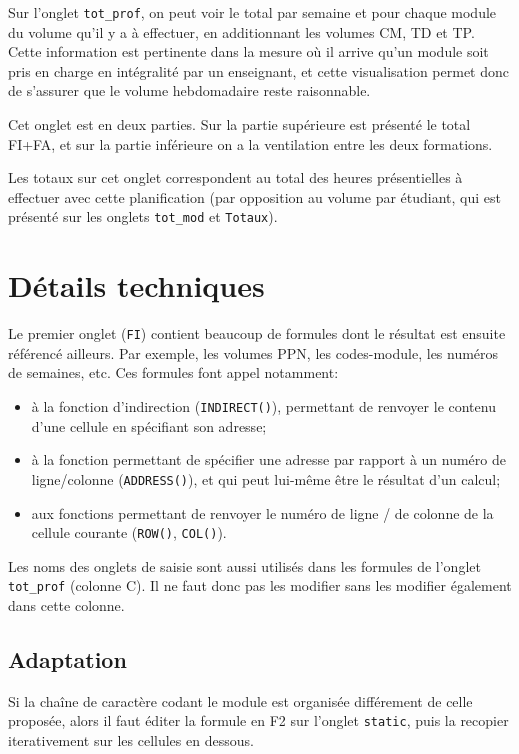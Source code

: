 \documentclass[12pt,a4paper]{article}
\begin{document}
Sur l'onglet {\tt tot\_prof}, on peut voir le total par semaine et pour chaque module du volume qu'il y a à effectuer, en additionnant les volumes CM, TD et TP.
Cette information est pertinente dans la mesure où il arrive qu'un module soit pris en charge en intégralité par un enseignant, et cette visualisation permet donc de s'assurer que le volume hebdomadaire reste raisonnable.

Cet onglet est en deux parties.
Sur la partie supérieure est présenté le total FI+FA,
et sur la partie inférieure on a la ventilation entre les deux formations.

Les totaux sur cet onglet correspondent au total des heures présentielles à effectuer avec cette planification (par opposition au volume par étudiant, qui est présenté sur les onglets {\tt tot\_mod} et {\tt Totaux}).

\section{Détails techniques}

Le premier onglet ({\tt FI}) contient beaucoup de formules dont le résultat est ensuite référencé ailleurs.
Par exemple, les volumes PPN, les codes-module, les numéros de semaines, etc.
Ces formules font appel notamment:
\begin{itemize}
\item à la fonction d'indirection ({\tt INDIRECT()}), permettant de renvoyer le contenu d'une cellule en spécifiant son adresse;
\item à la fonction permettant de spécifier une adresse par rapport à un numéro de ligne/colonne ({\tt ADDRESS()}), et qui peut lui-même être le résultat d'un calcul;
\item aux fonctions permettant de renvoyer le numéro de ligne / de colonne de la cellule courante ({\tt ROW()}, {\tt COL()}).
\end{itemize}

Les noms des onglets de saisie sont aussi utilisés dans les formules de l'onglet {\tt tot\_prof} (colonne C).
Il ne faut donc pas les modifier sans les modifier également dans cette colonne.

\subsection{Adaptation}

Si la chaîne de caractère codant le module est organisée différement de celle proposée, alors il faut éditer la formule en F2 sur l'onglet {\tt static}, puis la recopier iterativement sur les cellules en dessous.
\end{document}
